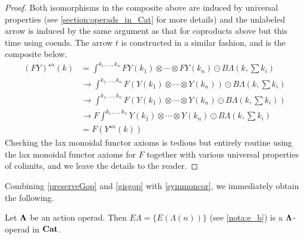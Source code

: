 \begin{proof}
Both isomorphisms in the composite above are induced by universal properties (see \cref{section:operads_in_Cat} for more details) and the unlabeled arrow is induced by the same argument as that for coproducts above but this time using coends. The arrow $t$ is constructed in a similar fashion, and is the composite below.
  \begin{align*}
    (FY)^{\star n}(k) & =  \int^{k_{1}, \ldots, k_{n}} FY(k_{1}) \otimes \cdots \otimes FY(k_{n}) \odot B\Lambda(k, \sum k_{i}) \\
    & \rightarrow   \int^{k_{1}, \ldots, k_{n}} F(Y(k_{1}) \otimes \cdots \otimes Y(k_{n})) \odot B\Lambda(k, \sum k_{i}) \\
    & \rightarrow  \int^{k_{1}, \ldots, k_{n}} F(Y(k_{1}) \otimes \cdots \otimes Y(k_{n}) \odot B\Lambda(k, \sum k_{i}) ) \\
    & \rightarrow  F\int^{k_{1}, \ldots, k_{n}} Y(k_{1}) \otimes \cdots \otimes Y(k_{n}) \odot B\Lambda(k, \sum k_{i})  \\
    & =  F(Y^{\star n}(k))
  \end{align*}
Checking the lax monoidal functor axioms is tedious but entirely routine using the lax monoidal functor axioms for $F$ together with various universal properties of colimits, and we leave the details to the reader.
\end{proof}

Combining \cref{preserveGop} and \cref{gisgop} with \cref{symmoncor}, we immediately obtain the following.

\begin{cor}\label{cor:elambda_lambdaop}
Let $\mathbf{\Lambda}$ be an action operad. Then $E\Lambda = \{ E\left(\Lambda(n)\right) \}$ (see \cref{nota:e_b}) is a $\mathbf{\Lambda}$-operad in $\mathbf{Cat}$.
\end{cor}

